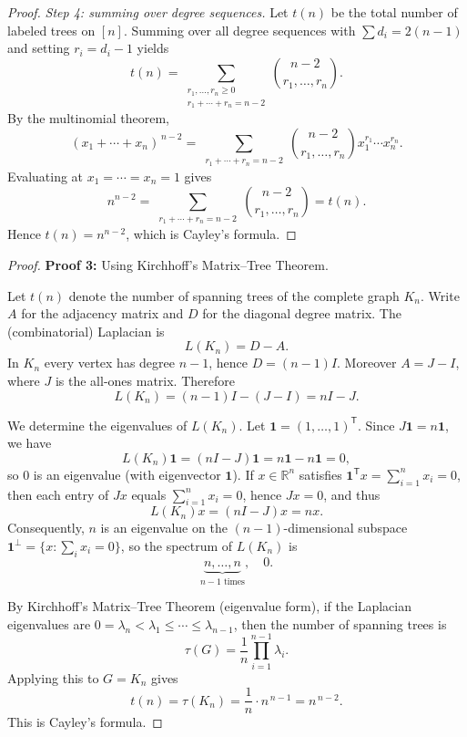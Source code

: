 \documentclass[11pt, a4paper]{ctexrep}
\begin{document}
\begin{proof}
    \noindent\emph{Step 4: summing over degree sequences.}
    Let $t(n)$ be the total number of labeled trees on $[n]$. Summing over all degree
    sequences with $\sum d_i=2(n-1)$ and setting $r_i=d_i-1$ yields
    \[
        t(n)=\sum_{\substack{r_1,\dots,r_n\ge 0\\ r_1+\cdots+r_n=n-2}}
        \binom{n-2}{r_1,\dots,r_n}.
    \]
    By the multinomial theorem,
    \[
        (x_1+\cdots+x_n)^{\,n-2}
        =\sum_{\substack{r_1+\cdots+r_n=n-2}}
        \binom{n-2}{r_1,\dots,r_n}x_1^{r_1}\cdots x_n^{r_n}.
    \]
    Evaluating at $x_1=\cdots=x_n=1$ gives
    \[
        n^{n-2}
        =\sum_{\substack{r_1+\cdots+r_n=n-2}}
        \binom{n-2}{r_1,\dots,r_n}
        =t(n).
    \]
    Hence $t(n)=n^{n-2}$, which is Cayley's formula.
\end{proof}

\begin{proof}
    \textbf{Proof 3:} Using Kirchhoff's Matrix--Tree Theorem.

    Let $t(n)$ denote the number of spanning trees of the complete graph $K_n$.
    Write $A$ for the adjacency matrix and $D$ for the diagonal degree matrix. The (combinatorial)
    Laplacian is
    \[
        L(K_n)=D-A.
    \]
    In $K_n$ every vertex has degree $n-1$, hence $D=(n-1)I$. Moreover $A=J-I$, where $J$ is the
    all-ones matrix. Therefore
    \[
        L(K_n)=(n-1)I-(J-I)=nI-J.
    \]

    We determine the eigenvalues of $L(K_n)$. Let $\mathbf{1}=(1,\dots,1)^{\mathsf T}$. Since
    $J\mathbf{1}=n\mathbf{1}$, we have
    \[
        L(K_n)\mathbf{1}=(nI-J)\mathbf{1}=n\mathbf{1}-n\mathbf{1}=0,
    \]
    so $0$ is an eigenvalue (with eigenvector $\mathbf{1}$).
    If $x\in\mathbb{R}^n$ satisfies $\mathbf{1}^{\mathsf T}x=\sum_{i=1}^n x_i=0$, then each entry of
    $Jx$ equals $\sum_{i=1}^n x_i=0$, hence $Jx=0$, and thus
    \[
        L(K_n)x=(nI-J)x=nx.
    \]
    Consequently, $n$ is an eigenvalue on the $(n-1)$-dimensional subspace
    $\mathbf{1}^\perp=\{x:\sum_i x_i=0\}$, so the spectrum of $L(K_n)$ is
    \[
        \underbrace{n,\dots,n}_{n-1\text{ times}},\quad 0.
    \]

    By Kirchhoff's Matrix--Tree Theorem (eigenvalue form), if the Laplacian eigenvalues are
    $0=\lambda_n<\lambda_1\le\cdots\le\lambda_{n-1}$, then the number of spanning trees is
    \[
        \tau(G)=\frac{1}{n}\prod_{i=1}^{n-1}\lambda_i.
    \]
    Applying this to $G=K_n$ gives
    \[
        t(n)=\tau(K_n)=\frac{1}{n}\cdot n^{\,n-1}=n^{\,n-2}.
    \]
    This is Cayley's formula.
\end{proof}
\end{document}
